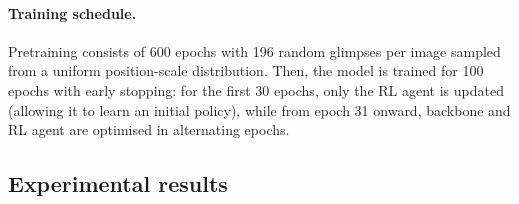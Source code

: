 \paragraph{Training schedule.} Pretraining consists of 600 epochs with 196 random glimpses per image sampled from a uniform position-scale distribution. Then, the model is trained for 100 epochs with early stopping: for the first 30 epochs, only the RL agent is updated (allowing it to learn an initial policy), while from epoch 31 onward, backbone and RL agent are optimised in alternating epochs.

\subsection{Experimental results}
\label{sec:adaglimpse-results}

